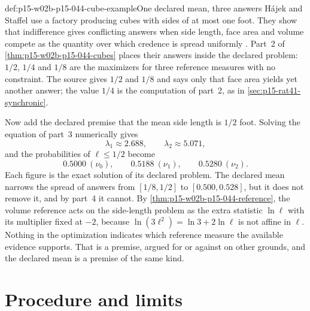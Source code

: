 \begin{hbexample}{def:p15-w02b-p15-044-cube-example}{One declared mean, three answers}
H\'ajek and Staffel use a factory producing cubes with sides of at most one
foot. They show that indifference gives conflicting answers when side
length, face area and volume compete as the quantity over which credence
is spread uniformly \cite[p.~244]{HajekStaffel2021Dynamics}. Part~2 of
\cref{thm:p15-w02b-p15-044-cubes} places their answers inside the declared
problem: \(1/2\), \(1/4\) and \(1/8\) are the maximizers for three
reference measures with no constraint. The source gives \(1/2\) and
\(1/8\) and says only that face area yields yet another answer; the value
\(1/4\) is the computation of part~2, as in \cref{sec:p15-rat41-synchronic}.

Now add the declared premise that the mean side length is \(1/2\) foot.
Solving the equation of part~3 numerically gives
\[
  \lambda_1\approx2.688,\qquad \lambda_2\approx5.071,
\]
and the probabilities of \(\ell\leq1/2\) become
\[
  0.5000\ (\nu_0),\qquad 0.5188\ (\nu_1),\qquad 0.5280\ (\nu_2).
\]
Each figure is the exact solution of its declared problem. The declared
mean narrows the spread of answers from \([1/8,1/2]\) to
\([0.500,0.528]\), but it does not remove it, and by part~4 it cannot. By
\cref{thm:p15-w02b-p15-044-reference}, the volume reference acts on the
side-length problem as the extra statistic \(\ln\ell\) with its multiplier
fixed at \(-2\), because \(\ln(3\ell^2)=\ln3+2\ln\ell\) is not affine in
\(\ell\). Nothing in the optimization indicates which reference measure the
available evidence supports. That is a premise, argued for or against on
other grounds, and the declared mean is a premise of the same kind.
\end{hbexample}

\section{Procedure and limits}
\label{sec:p15-w02b-p15-044-procedure}

